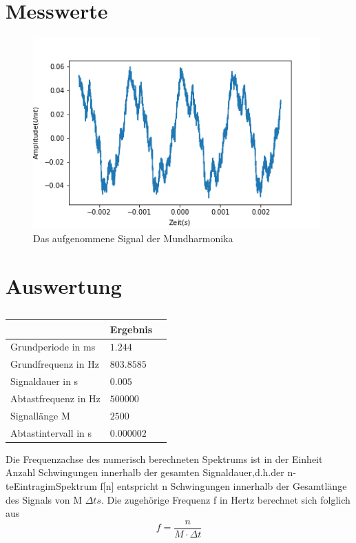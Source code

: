 \documentclass[12pt, oneside, a4paper, \docLanguage]{report}
\begin{document}
\section{Messwerte}
\label{chap:VERSUCH_1_MESSWERTE}
\begin{figure}[H]
	\centering\small
	\includegraphics[width=11cm]{messwerteharmonika.png}
	\caption{Das aufgenommene Signal der Mundharmonika}
\end{figure}
\section{Auswertung}
\label{chap:VERSUCH_1_AUSWERTUNG}

\begin{table}[H]
\centering
\begin{tabular}{|l|l|l|}
\hline
\multicolumn{1}{|c|}{} & \multicolumn{1}{c|}{Ergebnis}						\\ \hline
Grundperiode in ms						&$1.244$							\\ \hline
Grundfrequenz in Hz						&$803.8585$							\\ \hline
Signaldauer in s						&$0.005$							\\ \hline
Abtastfrequenz in Hz					&$500000$							\\ \hline
Signallänge M							&$2500$								\\ \hline
Abtastintervall in s					&$0.000002$							\\ \hline
\end{tabular}
\caption{}
\end{table}

Die Frequenzachse des numerisch berechneten Spektrums ist in der Einheit Anzahl Schwingungen innerhalb der gesamten Signaldauer,d.h.der n-teEintragimSpektrum f[n] entspricht n Schwingungen innerhalb der Gesamtlänge des Signals von M $\Delta{t} s$. Die zugehörige Frequenz f in Hertz berechnet sich folglich aus $$f=\frac{n}{M{\cdot}\Delta{t}}$$
 
\end{document}
